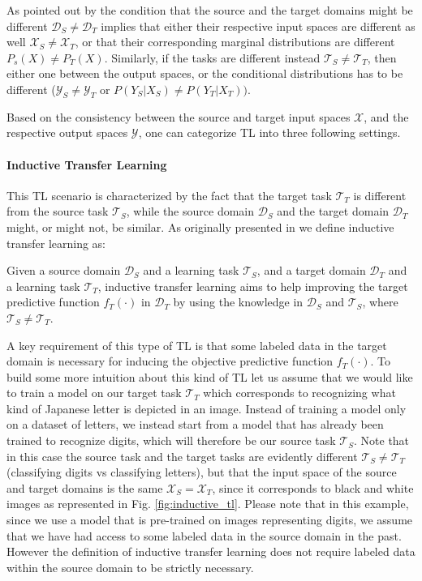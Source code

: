As pointed out by \citet{pan2009survey} the condition that the source and the target domains might be different $\mathcal{D}_S \neq \mathcal{D}_T$ implies that either their respective input spaces are different as well $\mathcal{X}_S\neq\mathcal{X}_T$, or that their corresponding marginal distributions are different $P_s(X)\neq P_T(X)$. Similarly, if the tasks are different instead $\mathcal{T}_S\neq\mathcal{T}_T$, then either one between the output spaces, or the conditional distributions has to be different ($\mathcal{Y}_S\neq\mathcal{Y}_T$ or $P(Y_S|X_S)\neq P(Y_T|X_T))$.

Based on the consistency between the source and target input spaces $\mathcal{X}$, and the respective output spaces $\mathcal{Y}$, one can categorize TL into three following settings.

\paragraph{Inductive Transfer Learning}
This TL scenario is characterized by the fact that the target task $\mathcal{T}_T$ is different from the source task $\mathcal{T}_S$, while the source domain $\mathcal{D}_S$ and the target domain $\mathcal{D}_T$ might, or might not, be similar. As originally presented in \cite{pan2009survey} we define inductive transfer learning as:
\begin{definition}
	Given a source domain $\mathcal{D}_S$ and a learning task $\mathcal{T}_S$, and a target domain $\mathcal{D}_T$ and a learning task $\mathcal{T}_T$, inductive transfer learning aims to help improving the target predictive function $f_T(\cdot)$ in $\mathcal{D}_T$ by using the knowledge in $\mathcal{D}_S$ and $\mathcal{T}_S$, where $\mathcal{T}_S \neq \mathcal{T}_T$. 
\end{definition}
A key requirement of this type of TL is that some labeled data in the target domain is necessary for inducing the objective predictive function $f_T(\cdot)$. To build some more intuition about this kind of TL let us assume that we would like to train a model on our target task $\mathcal{T}_T$ which corresponds to recognizing what kind of Japanese letter is depicted in an image. Instead of training a model only on a dataset of letters, we instead start from a model that has already been trained to recognize digits, which will therefore be our source task $\mathcal{T}_S$. Note that in this case the source task and the target tasks are evidently different $\mathcal{T}_S \neq \mathcal{T}_T$ (classifying digits vs classifying letters), but that the input space of the source and target domains is the same $\mathcal{X}_S = \mathcal{X}_T$, since it corresponds to black and white images as represented in Fig. \ref{fig:inductive_tl}. Please note that in this example, since we use a model that is pre-trained on images representing digits, we assume that we have had access to some labeled data in the source domain in the past. However the definition of inductive transfer learning does not require labeled data within the source domain to be strictly necessary.

